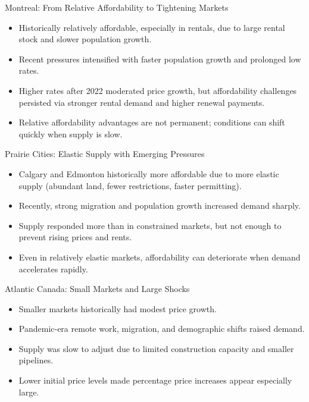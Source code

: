 \documentclass[aspectratio=169]{beamer}
\begin{document}
\begin{frame}{Montreal: From Relative Affordability to Tightening Markets}
\transfade
\begin{itemize}[<+->]
  \item Historically relatively affordable, especially in rentals, due to large rental stock and slower population growth.
  \item Recent pressures intensified with faster population growth and prolonged low rates.
  \item Higher rates after 2022 moderated price growth, but affordability challenges persisted via stronger rental demand and higher renewal payments.
  \item Relative affordability advantages are not permanent; conditions can shift quickly when supply is slow.
\end{itemize}
\end{frame}

\begin{frame}{Prairie Cities: Elastic Supply with Emerging Pressures}
\transfade
\begin{itemize}[<+->]
  \item Calgary and Edmonton historically more affordable due to more elastic supply (abundant land, fewer restrictions, faster permitting).
  \item Recently, strong migration and population growth increased demand sharply.
  \item Supply responded more than in constrained markets, but not enough to prevent rising prices and rents.
  \item Even in relatively elastic markets, affordability can deteriorate when demand accelerates rapidly.
\end{itemize}
\end{frame}

\begin{frame}{Atlantic Canada: Small Markets and Large Shocks}
\transfade
\begin{itemize}[<+->]
  \item Smaller markets historically had modest price growth.
  \item Pandemic-era remote work, migration, and demographic shifts raised demand.
  \item Supply was slow to adjust due to limited construction capacity and smaller pipelines.
  \item Lower initial price levels made percentage price increases appear especially large.
\end{itemize}
\end{frame}
\end{document}
